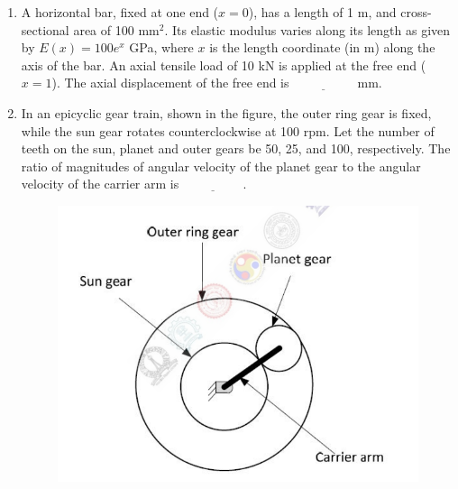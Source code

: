 \documentclass[journal]{IEEEtran}
\begin{document}
\begin{enumerate}[leftmargin=0pt]
    \item A horizontal bar, fixed at one end ($x=0$), has a length of 1 m, and cross-sectional area of 100 mm$^2$. Its elastic modulus varies along its length as given by $E(x) = 100 e^x$ GPa, where $x$ is the length coordinate (in m) along the axis of the bar. An axial tensile load of 10 kN is applied at the free end ($x=1$). The axial displacement of the free end is $\underline{\hspace{2cm}}$ mm.

    \item In an epicyclic gear train, shown in the figure, the outer ring gear is fixed, while the sun gear rotates counterclockwise at 100 rpm. Let the number of teeth on the sun, planet and outer gears be 50, 25, and 100, respectively. The ratio of magnitudes of angular velocity of the planet gear to the angular velocity of the carrier arm is $\underline{\hspace{2cm}}$.
    \begin{figure}[h]
    \centering
    \includegraphics[width=0.5\columnwidth]{Figs/image (28).png}
    \caption*{}
    \label{fig:45}
    \end{figure}


\end{enumerate}
\end{document}
